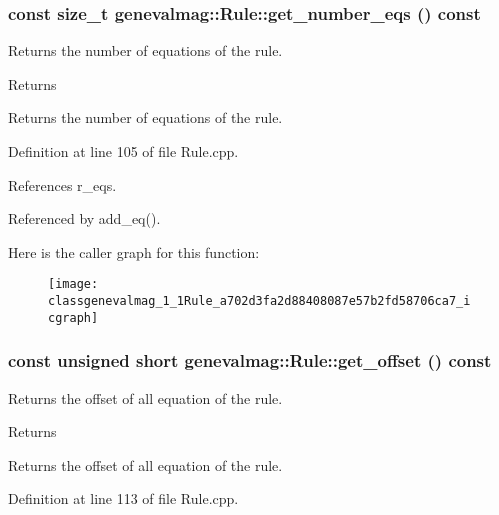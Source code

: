 \hypertarget{classgenevalmag_1_1Rule_a702d3fa2d88408087e57b2fd58706ca7}{
\subsubsection[{get\_\-number\_\-eqs}]{\setlength{\rightskip}{0pt plus 5cm}const size\_\-t genevalmag::Rule::get\_\-number\_\-eqs () const}}
\label{classgenevalmag_1_1Rule_a702d3fa2d88408087e57b2fd58706ca7}
Returns the number of equations of the rule. \begin{DoxyReturn}{Returns}

\end{DoxyReturn}
Returns the number of equations of the rule. 

Definition at line 105 of file Rule.cpp.



References r\_\-eqs.



Referenced by add\_\-eq().



Here is the caller graph for this function:\nopagebreak
\begin{figure}[H]
\begin{center}
\leavevmode
\texttt{[image: classgenevalmag\_1\_1Rule\_a702d3fa2d88408087e57b2fd58706ca7\_icgraph]}
\end{center}
\end{figure}


\hypertarget{classgenevalmag_1_1Rule_ae0c8764f699b6c41f46a9a0c6e010e6c}{
\subsubsection[{get\_\-offset}]{\setlength{\rightskip}{0pt plus 5cm}const unsigned short genevalmag::Rule::get\_\-offset () const}}
\label{classgenevalmag_1_1Rule_ae0c8764f699b6c41f46a9a0c6e010e6c}
Returns the offset of all equation of the rule. \begin{DoxyReturn}{Returns}

\end{DoxyReturn}
Returns the offset of all equation of the rule. 

Definition at line 113 of file Rule.cpp.



